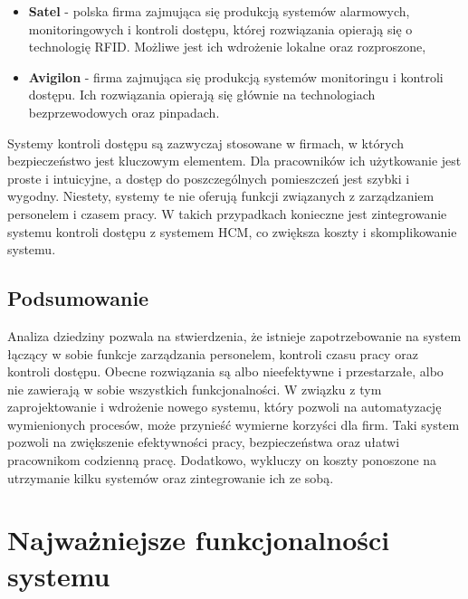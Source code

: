 \begin{itemize}
    \item \textbf{Satel} - polska firma zajmująca się produkcją systemów alarmowych, monitoringowych i kontroli dostępu, której rozwiązania opierają się o technologię RFID. Możliwe jest ich wdrożenie lokalne oraz rozproszone,
    \item \textbf{Avigilon} - firma zajmująca się produkcją systemów monitoringu i kontroli dostępu. Ich rozwiązania opierają się głównie na technologiach bezprzewodowych oraz pinpadach.
\end{itemize}

Systemy kontroli dostępu są zazwyczaj stosowane w firmach, w których bezpieczeństwo jest kluczowym elementem. Dla pracowników ich użytkowanie jest proste i intuicyjne, a dostęp do poszczególnych pomieszczeń jest szybki i wygodny. Niestety, systemy te nie oferują funkcji związanych z zarządzaniem personelem i czasem pracy. W takich przypadkach konieczne jest zintegrowanie systemu kontroli dostępu z systemem HCM, co zwiększa koszty i skomplikowanie systemu.

\subsection{Podsumowanie}

Analiza dziedziny pozwala na stwierdzenia, że istnieje zapotrzebowanie na system łączący w sobie funkcje zarządzania personelem, kontroli czasu pracy oraz kontroli dostępu. Obecne rozwiązania są albo nieefektywne i przestarzałe, albo nie zawierają w sobie wszystkich funkcjonalności. W związku z tym zaprojektowanie i wdrożenie nowego systemu, który pozwoli na automatyzację wymienionych procesów, może przynieść wymierne korzyści dla firm. Taki system pozwoli na zwiększenie efektywności pracy, bezpieczeństwa oraz ułatwi pracownikom codzienną pracę. Dodatkowo, wykluczy on koszty ponoszone na utrzymanie kilku systemów oraz zintegrowanie ich ze sobą.


\section{Najważniejsze funkcjonalności systemu}

